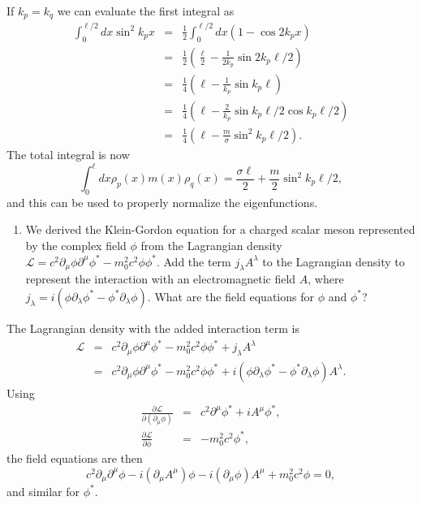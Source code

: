 \documentclass[letterpaper,11pt]{article}
\begin{document}
If $k_p = k_q$ we can evaluate the first integral as
\begin{eqnarray*}
 \int_0^{\ell/2} dx \sin^2 k_p x & = & \frac{1}{2} \int_0^{\ell/2} dx ( 1 - \cos 2 k_p x) \\
 & = & \frac{1}{2} \left( \frac{\ell}{2} - \frac{1}{2 k_p} \sin 2 k_p \ell/2 \right) \\
 & = & \frac{1}{4} \left( \ell - \frac{1}{k_p} \sin k_p \ell \right) \\
 & = & \frac{1}{4} \left( \ell - \frac{2}{k_p} \sin k_p \ell/2 \cos k_p \ell/2 \right) \\
 & = & \frac{1}{4} \left( \ell - \frac{m}{\sigma} \sin^2 k_p \ell/2 \right).
\end{eqnarray*}
The total integral is now
\begin{equation*}
 \int_0^\ell dx \rho_p(x) m(x) \rho_q(x) = \frac{\sigma \ell}{2} + \frac{m}{2} \sin^2 k_p \ell/2,
\end{equation*}
and this can be used to properly normalize the eigenfunctions.

\begin{enumerate}[resume]
 \item We derived the Klein-Gordon equation for a charged scalar meson represented by the complex field $\phi$ from the Lagrangian density $\mathcal{L} = c^2 \partial_\mu \phi \partial^\mu \phi^* - m_0^2 c^2 \phi \phi^*$.  Add the term $j_\lambda A^\lambda$ to the Lagrangian density to represent the interaction with an electromagnetic field $A$, where $j_\lambda = i(\phi \partial_\lambda \phi^* - \phi^* \partial_\lambda \phi)$.  What are the field equations for $\phi$ and $\phi^*$?
\end{enumerate}
The Lagrangian density with the added interaction term is
\begin{eqnarray*}
 \mathcal{L} & = & c^2 \partial_\mu \phi \partial^\mu \phi^* - m_0^2 c^2 \phi \phi^* + j_\lambda A^\lambda \\
 & = & c^2 \partial_\mu \phi \partial^\mu \phi^* - m_0^2 c^2 \phi \phi^* + i(\phi \partial_\lambda \phi^* - \phi^* \partial_\lambda \phi) A^\lambda.
\end{eqnarray*}
Using
\begin{eqnarray*}
 \frac{\partial \mathcal{L}}{\partial(\partial_\mu\phi)} & = & c^2 \partial^\mu \phi^* + i A^\mu \phi^*, \\
 \frac{\partial \mathcal{L}}{\partial \phi} & = & - m_0^2 c^2 \phi^*,
\end{eqnarray*}
the field equations are then
\begin{equation*}
 c^2 \partial_\mu \partial^\mu \phi - i (\partial_\mu A^\mu) \phi - i (\partial_\mu \phi) A^\mu + m_0^2 c^2 \phi = 0,
\end{equation*}
and similar for $\phi^*$.
\end{document}
